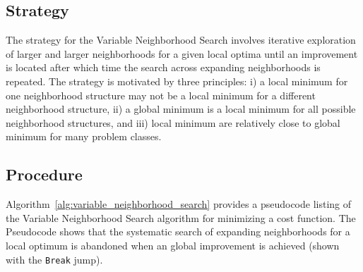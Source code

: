 \subsection{Strategy}
The strategy for the Variable Neighborhood Search involves iterative exploration of larger and larger neighborhoods for a given local optima until an improvement is located after which time the search across expanding neighborhoods is repeated. 
The strategy is motivated by three principles: i) a local minimum for one neighborhood structure may not be a local minimum for a different neighborhood structure, ii) a global minimum is a local minimum for all possible neighborhood structures, and iii) local minimum are relatively close to global minimum for many problem classes.

\subsection{Procedure}
Algorithm~\ref{alg:variable_neighborhood_search} provides a pseudocode listing of the Variable Neighborhood Search algorithm for minimizing a cost function.
The Pseudocode shows that the systematic search of expanding neighborhoods for a local optimum is abandoned when an global improvement is achieved (shown with the \texttt{Break} jump).

